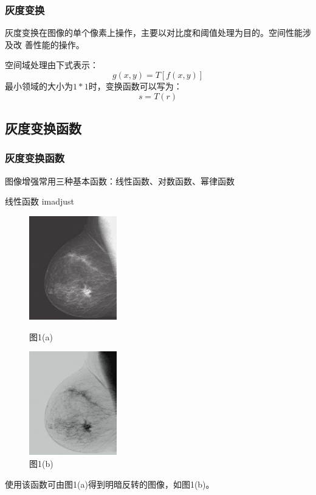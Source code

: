 \documentclass[notheorems,serif,table,compress]{beamer}  %
\begin{document}


\begin{frame}[fragile]
\frametitle{灰度变换}
灰度变换在图像的单个像素上操作，主要以对比度和阈值处理为目的。空间性能涉及改
善性能的操作。

空间域处理由下式表示：
\begin{equation} \label{3.1}  %
g(x,y)=T[f(x,y)]
\end{equation}
最小领域的大小为$1*1$时，变换函数可以写为：
\begin{equation} \label{3.2}  
 s=T(r) 
\end{equation}
\end{frame}


\subsection{灰度变换函数}

\begin{frame}
\frametitle{灰度变换函数}
 图像增强常用三种基本函数：线性函数、对数函数、幂律函数
 \begin{description}
 \item [线性函数 imadjust]
 \end{description}
 \begin{figure}[!ht]
  \begin{minipage}[t]{0.4\textwidth}	
  \centering
  \includegraphics[width=1.5in]{imadjust_a.png}
  \caption{图1(a)}
  \end{minipage}
  \begin{minipage}[t]{0.4\textwidth}
  \centering
  \includegraphics[width=1.5in]{imadjust_b.png}
  \caption{图1(b)}
  \end{minipage}
  \end{figure} 
使用该函数可由图1(a)得到明暗反转的图像，如图1(b)。
\end{frame}
 
\end{document}
